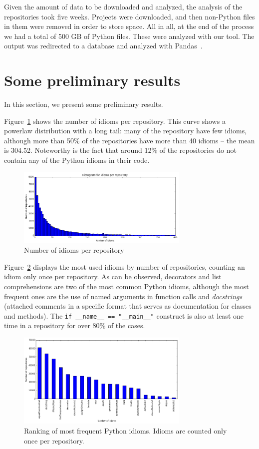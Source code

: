 \documentclass[a4paper]{article}
\begin{document}
Given the amount of data to be downloaded and analyzed, the analysis of the repositories took five weeks. Projects were downloaded, and then non-Python files in them were removed in order to store space. All in all, at the end of the process we had a total of 500 GB of Python files. These were analyzed with our tool. The output was redirected to a database and analyzed with Pandas~\cite{mckinney2012python}.

\section{Some preliminary results}

In this section, we present some preliminary results. 

Figure~\ref{fig:idioms_per_repository} shows the number of idioms per repository. This curve shows a powerlaw distribution with a long tail: many of the repository have few idioms, although more than 50\% of the repositories have more than 40 idioms -- the mean is 304.52. Noteworthy is the fact that around 12\% of the repositories do not contain any of the Python idioms in their code.

\begin{figure}[ht]
\centering  
\includegraphics[width=82mm]{img/idioms_per_repository.png}
\caption{Number of idioms per repository}
\label{fig:idioms_per_repository}
\end{figure}


Figure~\ref{fig:idiom_ranking} displays the most used idioms by number of repositories, counting an idiom only once per repository. As can be observed, decorators and list comprehensions are two of the most common Python idioms, although the most frequent ones are the use of named arguments in function calls and \emph{docstrings} (attached comments in a specific format that serves as documentation for classes and methods). The \verb|if __name__ == "__main__"| construct is also at least one time in a repository for over 80\% of the cases.

\begin{figure}[ht]
\centering
\includegraphics[width=82mm]{img/num_idiom_repo.png}
\caption{Ranking of most frequent Python idioms. Idioms are counted only once per repository.}
\label{fig:idiom_ranking}
\end{figure}
\end{document}
